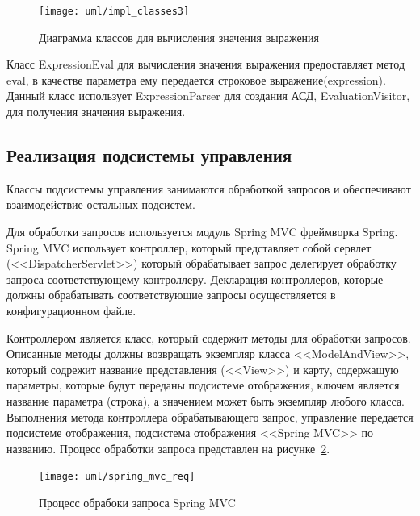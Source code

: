 \documentclass[14pt,a4paper]{reportmod}
\begin{document}
\begin{figure}
  \centering
  \texttt{[image: uml/impl\_classes3]}
  \caption{Диаграмма классов для вычисления значения выражения}
  \label{pic:evalclasses}
\end{figure}

Класс ExpressionEval для вычисления значения выражения предоставляет метод eval, в качестве параметра ему передается строковое выражение(expression). Данный класс использует ExpressionParser для создания АСД, EvaluationVisitor, для получения значения выражения.

\subsection{Реализация подсистемы управления}

Классы подсистемы управления занимаются обработкой запросов и обеспечивают взаимодействие остальных подсистем.


Для обработки запросов используется модуль Spring MVC фреймворка Spring. Spring MVC использует контроллер, который представляет собой сервлет (<<DispatcherServlet>>) который обрабатывает запрос делегирует обработку запроса соответствующему контроллеру. Декларация контроллеров, которые должны обрабатывать соответствующие запросы осуществляется в конфигурационном файле.


Контроллером является класс, который содержит методы для обработки запросов. Описанные методы должны возвращать экземпляр класса <<ModelAndView>>, который содрежит название представления (<<View>>) и карту, содержащую параметры, которые будут переданы подсистеме отображения, ключем является название параметра (строка), а значением может быть экземпляр любого класса. Выполнения метода контроллера обрабатывающего запрос, управление передается подсистеме отображения, подсистема отображения <<Spring MVC>> по названию. Процесс обработки запроса представлен на рисунке~\ref{pic:springmvcref}.


\begin{figure}
  \centering
  \texttt{[image: uml/spring\_mvc\_req]}
  \caption{Процесс обрабоки запроса Spring MVC}
  \label{pic:springmvcref}
\end{figure}
\end{document}
